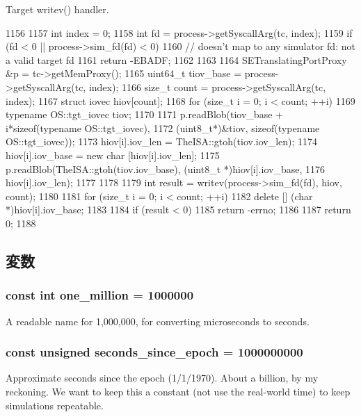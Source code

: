 Target writev() handler. 


\begin{DoxyCode}
1156 {
1157     int index = 0;
1158     int fd = process->getSyscallArg(tc, index);
1159     if (fd < 0 || process->sim_fd(fd) < 0) {
1160         // doesn't map to any simulator fd: not a valid target fd
1161         return -EBADF;
1162     }
1163 
1164     SETranslatingPortProxy &p = tc->getMemProxy();
1165     uint64_t tiov_base = process->getSyscallArg(tc, index);
1166     size_t count = process->getSyscallArg(tc, index);
1167     struct iovec hiov[count];
1168     for (size_t i = 0; i < count; ++i) {
1169         typename OS::tgt_iovec tiov;
1170 
1171         p.readBlob(tiov_base + i*sizeof(typename OS::tgt_iovec),
1172                    (uint8_t*)&tiov, sizeof(typename OS::tgt_iovec));
1173         hiov[i].iov_len = TheISA::gtoh(tiov.iov_len);
1174         hiov[i].iov_base = new char [hiov[i].iov_len];
1175         p.readBlob(TheISA::gtoh(tiov.iov_base), (uint8_t *)hiov[i].iov_base,
1176                    hiov[i].iov_len);
1177     }
1178 
1179     int result = writev(process->sim_fd(fd), hiov, count);
1180 
1181     for (size_t i = 0; i < count; ++i)
1182         delete [] (char *)hiov[i].iov_base;
1183 
1184     if (result < 0)
1185         return -errno;
1186 
1187     return 0;
1188 }
\end{DoxyCode}


\subsection{変数}
\hypertarget{syscall__emul_8hh_a669e0ac171376b8be956f4ac131e78a7}{
\subsubsection[{one\_\-million}]{\setlength{\rightskip}{0pt plus 5cm}const int {\bf one\_\-million} = 1000000}}
\label{syscall__emul_8hh_a669e0ac171376b8be956f4ac131e78a7}


A readable name for 1,000,000, for converting microseconds to seconds. \hypertarget{syscall__emul_8hh_a39e588dacd751ca716fd5352f319e401}{
\subsubsection[{seconds\_\-since\_\-epoch}]{\setlength{\rightskip}{0pt plus 5cm}const unsigned {\bf seconds\_\-since\_\-epoch} = 1000000000}}
\label{syscall__emul_8hh_a39e588dacd751ca716fd5352f319e401}
Approximate seconds since the epoch (1/1/1970). About a billion, by my reckoning. We want to keep this a constant (not use the real-\/world time) to keep simulations repeatable. 